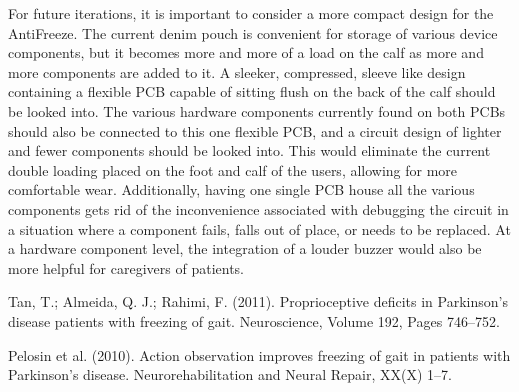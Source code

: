 \documentclass[titlepage]{article}
\begin{document}
\begin{doublespacing}
     For future iterations, it is important to consider a more compact design for the AntiFreeze. The current denim pouch is convenient for storage of various device components, but it becomes more and more of a load on the calf as more and more components are added to it. A sleeker, compressed, sleeve like design containing a flexible PCB capable of sitting flush on the back of the calf should be looked into. The various hardware components currently found on both PCBs should also be connected to this one flexible PCB, and a circuit design of lighter and fewer components should be looked into. This would eliminate the current double loading placed on the foot and calf of the users, allowing for more comfortable wear. Additionally, having one single PCB house all the various components gets rid of the inconvenience associated with debugging the circuit in a situation where a component fails, falls out of place, or needs to be replaced. At a hardware component level, the integration of a louder buzzer would also be more helpful for caregivers of patients. 

\clearpage
\begin{thebibliography}{99}
Tan, T.; Almeida, Q. J.; Rahimi, F.
(2011).
Proprioceptive deficits in Parkinson's disease patients with freezing of gait.
Neuroscience, Volume 192, Pages 746–752.

Pelosin et al.
(2010).
Action observation improves freezing of gait in patients with Parkinson's disease.
Neurorehabilitation and Neural Repair, XX(X) 1–7.

\end{thebibliography}
\end{doublespacing}
\end{document}
